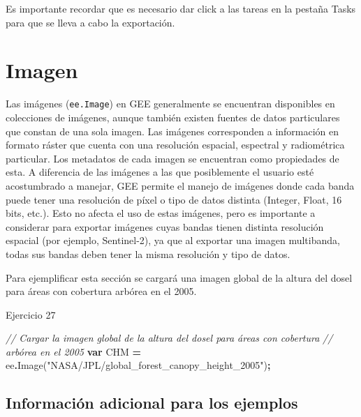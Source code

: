 \documentclass[
  12pt,
  letterpaper,
  twoside]{book}
\newenvironment{Shaded}{\begin{snugshade}}{\end{snugshade}}
\newcommand{\CommentTok}[1]{\textcolor[rgb]{0.56,0.35,0.01}{\textit{#1}}}
\newcommand{\FunctionTok}[1]{\textcolor[rgb]{0.00,0.00,0.00}{#1}}
\newcommand{\KeywordTok}[1]{\textcolor[rgb]{0.13,0.29,0.53}{\textbf{#1}}}
\newcommand{\NormalTok}[1]{#1}
\newcommand{\OperatorTok}[1]{\textcolor[rgb]{0.81,0.36,0.00}{\textbf{#1}}}
\newcommand{\StringTok}[1]{\textcolor[rgb]{0.31,0.60,0.02}{#1}}
\begin{document}
Es importante recordar que es necesario dar click a las tareas en la pestaña Tasks para que se lleva a cabo la exportación.

\newpage

\hypertarget{imagen}{%
\chapter{Imagen}\label{imagen}}

Las imágenes (\texttt{ee.Image}) en GEE generalmente se encuentran disponibles en colecciones de imágenes, aunque también existen fuentes de datos particulares que constan de una sola imagen. Las imágenes corresponden a información en formato ráster que cuenta con una resolución espacial, espectral y radiométrica particular. Los metadatos de cada imagen se encuentran como propiedades de esta. A diferencia de las imágenes a las que posiblemente el usuario esté acostumbrado a manejar, GEE permite el manejo de imágenes donde cada banda puede tener una resolución de píxel o tipo de datos distinta (Integer, Float, 16 bits, etc.). Esto no afecta el uso de estas imágenes, pero es importante a considerar para exportar imágenes cuyas bandas tienen distinta resolución espacial (por ejemplo, Sentinel-2), ya que al exportar una imagen multibanda, todas sus bandas deben tener la misma resolución y tipo de datos.

Para ejemplificar esta sección se cargará una imagen global de la altura del dosel para áreas con cobertura arbórea en el 2005.

Ejercicio 27

\begin{Shaded}
\begin{Highlighting}[]
\CommentTok{// Cargar la imagen global de la altura del dosel para áreas con cobertura }
\CommentTok{// arbórea en el 2005}
\KeywordTok{var}\NormalTok{ CHM }\OperatorTok{=}\NormalTok{ ee}\OperatorTok{.}\FunctionTok{Image}\NormalTok{(}\StringTok{"NASA/JPL/global\_forest\_canopy\_height\_2005"}\NormalTok{)}\OperatorTok{;}
\end{Highlighting}
\end{Shaded}

\hypertarget{informaciuxf3n-adicional-para-los-ejemplos}{%
\section{Información adicional para los ejemplos}\label{informaciuxf3n-adicional-para-los-ejemplos}}
\end{document}
